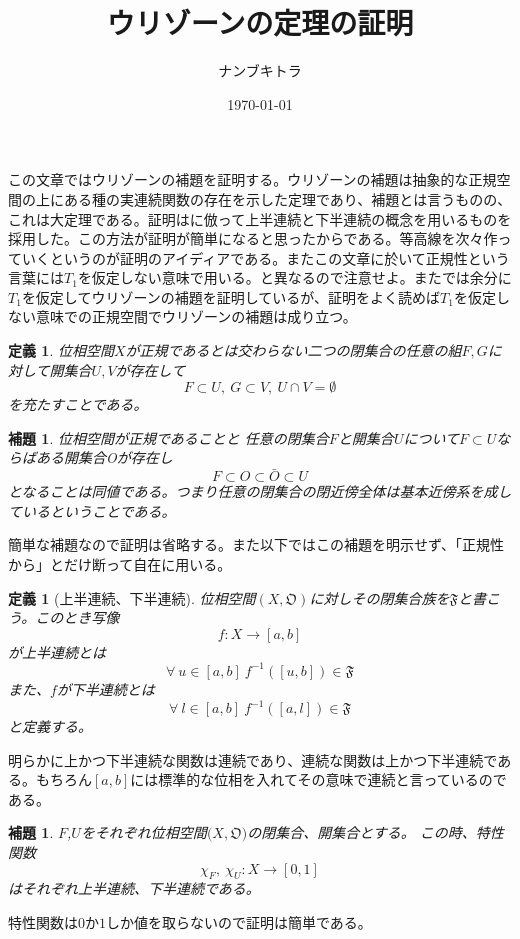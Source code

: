 \documentclass{jsarticle}
\title{ウリゾーンの定理の証明}
\author{ナンブキトラ}
\date{\today}
\newtheorem{lemma}[theorem]{補題}
\newtheorem{defnition}[theorem]{定義}
\begin{document}
\maketitle
この文章ではウリゾーンの補題を証明する。ウリゾーンの補題は抽象的な正規空間の上にある種の実連続関数の存在を示した定理であり、補題とは言うものの、これは大定理である。証明は\cite{2}に倣って上半連続と下半連続の概念を用いるものを採用した。この方法が証明が簡単になると思ったからである。等高線を次々作っていくというのが証明のアイディアである。またこの文章に於いて正規性という言葉には$T_1$を仮定しない意味で用いる。\cite{1}と異なるので注意せよ。また\cite{1}では余分に$T_1$を仮定してウリゾーンの補題を証明しているが、証明をよく読めば$T_1$を仮定しない意味での正規空間でウリゾーンの補題は成り立つ。
\\ 

\begin{defnition}
位相空間$X$が正規であるとは交わらない二つの閉集合の任意の組$F,G$に対して開集合$U,V$が存在して
\[
F\subset U,\ G\subset V,\ U\cap V =\emptyset
\]を充たすことである。
\end{defnition}

\begin{lemma}位相空間が正規であることと
任意の閉集合$F$と開集合$U$について$F\subset U$ならばある開集合Oが存在し
\[
F\subset O\subset \bar{O}\subset U
\]となることは同値である。つまり任意の閉集合の閉近傍全体は基本近傍系を成しているということである。
\end{lemma}
簡単な補題なので証明は省略する。また以下ではこの補題を明示せず、「正規性から」とだけ断って自在に用いる。

\begin{defnition}[上半連続、下半連続]
位相空間$(X,\mathfrak{O})$に対しその閉集合族を$\mathfrak{F}$と書こう。このとき写像
\[
f:X\rightarrow [a,b]
\]
が上半連続とは
\[
\forall \ u\in [a,b]\ f^{-1}([u,b])\in \mathfrak{F}
\]
また、$f$が下半連続とは
\[
\forall \ l\in [a,b]\ f^{-1}([a,l])\in \mathfrak{F}
\]
と定義する。
\end{defnition}

明らかに上かつ下半連続な関数は連続であり、連続な関数は上かつ下半連続である。もちろん$[a,b]$には標準的な位相を入れてその意味で連続と言っているのである。\\

\begin{lemma}$F$,$U$をそれぞれ位相空間$(X,\mathfrak{O)}$の閉集合、開集合とする。
この時、特性関数
\[
\chi_{F},\ \chi_{U}:X\rightarrow [0,1]
\]はそれぞれ上半連続、下半連続である。
\end{lemma}特性関数は$0$か$1$しか値を取らないので証明は簡単である。
\end{document}
